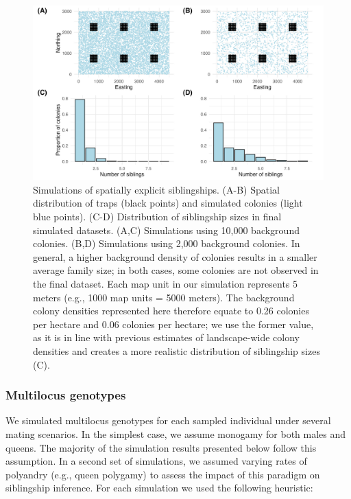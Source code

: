 \documentclass[12pt]{article}
\begin{document}
\begin{figure}[H]
    \centering
    \includegraphics[width=\linewidth]{appendix_figures/simulations.jpg}
    \caption{Simulations of spatially explicit siblingships. (A-B) Spatial distribution of traps (black points) and simulated colonies (light blue points). (C-D) Distribution of siblingship sizes in final simulated datasets. (A,C) Simulations using 10,000 background colonies. (B,D) Simulations using 2,000 background colonies. In general, a higher background density of colonies results in a smaller average family size; in both cases, some colonies are not observed in the final dataset. Each map unit in our simulation represents 5 meters (e.g., 1000 map units = 5000 meters). The background colony densities represented here therefore equate to 0.26 colonies per hectare and 0.06 colonies per hectare; we use the former value, as it is in line with previous estimates of landscape-wide colony densities and creates a more realistic distribution of siblingship sizes (C).}
    \label{fig:simulations}
\end{figure}


\subsubsection{Multilocus genotypes}
We simulated multilocus genotypes for each sampled individual under several mating scenarios. In the simplest case, we assume monogamy for both males and queens. The majority of the simulation results presented below follow this assumption. In a second set of simulations, we assumed varying rates of polyandry (e.g., queen polygamy) to assess the impact of this paradigm on siblingship inference. For each simulation we used the following heuristic:
\end{document}
